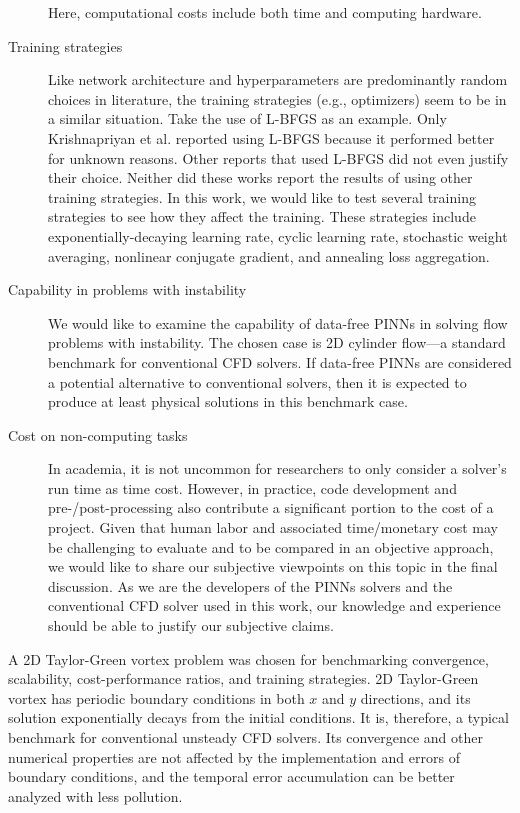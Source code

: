\begin{description}
        Here, computational costs include both time and computing hardware.
    \item[Training strategies]
        Like network architecture and hyperparameters are predominantly random choices in literature, the training strategies (e.g., optimizers) seem to be in a similar situation.
        Take the use of L-BFGS as an example.
        Only Krishnapriyan et al. \cite{krishnapriyan_characterizing_2021} reported using L-BFGS because it performed better for unknown reasons.
        Other reports that used L-BFGS did not even justify their choice.
        Neither did these works report the results of using other training strategies.
        In this work, we would like to test several training strategies to see how they affect the training.
        These strategies include exponentially-decaying learning rate, cyclic learning rate, stochastic weight averaging, nonlinear conjugate gradient, and annealing loss aggregation.
    \item[Capability in problems with instability]
        We would like to examine the capability of data-free PINNs in solving flow problems with instability.
        The chosen case is 2D cylinder flow---a standard benchmark for conventional CFD solvers.
        If data-free PINNs are considered a potential alternative to conventional solvers, then it is expected to produce at least physical solutions in this benchmark case.
    \item[Cost on non-computing tasks]
        In academia, it is not uncommon for researchers to only consider a solver's run time as time cost.
        However, in practice, code development and pre-/post-processing also contribute a significant portion to the cost of a project.
        Given that human labor and associated time/monetary cost may be challenging to evaluate and to be compared in an objective approach, we would like to share our subjective viewpoints on this topic in the final discussion.
        As we are the developers of the PINNs solvers and the conventional CFD solver used in this work, our knowledge and experience should be able to justify our subjective claims.
\end{description}

A 2D Taylor-Green vortex problem was chosen for benchmarking convergence, scalability, cost-performance ratios, and training strategies.
2D Taylor-Green vortex has periodic boundary conditions in both $x$ and $y$ directions, and its solution exponentially decays from the initial conditions.
It is, therefore, a typical benchmark for conventional unsteady CFD solvers.
Its convergence and other numerical properties are not affected by the implementation and errors of boundary conditions, and the temporal error accumulation can be better analyzed with less pollution.

